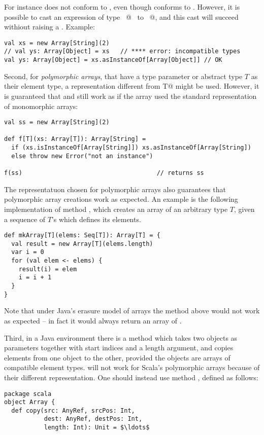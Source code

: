 {For instance  does not conform to
, even though  conforms to .
However, it is possible to cast an expression of type
~\lstinline@Array[String]@~ to ~\lstinline@Array[Object]@, and this
cast will succeed withiout raising a . Example:
\begin{lstlisting}
val xs = new Array[String](2)
// val ys: Array[Object] = xs   // **** error: incompatible types
val ys: Array[Object] = xs.asInstanceOf[Array[Object]] // OK
\end{lstlisting}

Second, for {\em polymorphic arrays}, that have a type parameter or
abstract type $T$ as their element type, a representation different
from
\lstinline@[]T@ might be used. However, it is guaranteed that 
 and  still work as if the array 
used the standard representation of monomorphic arrays:
\begin{lstlisting}
val ss = new Array[String](2)

def f[T](xs: Array[T]): Array[String] = 
  if (xs.isInstanceOf[Array[String]]) xs.asInstanceOf[Array[String])
  else throw new Error("not an instance")

f(ss)                                     // returns ss
\end{lstlisting}
The representatuon chosen for polymorphic arrays also guarantees that
polymorphic array creations work as expected. An example is the
following implementation of method \lstinline@mkArray@, which creates
an array of an arbitrary type $T$, given a sequence of $T$'s which
defines its elements.
\begin{lstlisting}
def mkArray[T](elems: Seq[T]): Array[T] = {
  val result = new Array[T](elems.length)
  var i = 0
  for (val elem <- elems) {
    result(i) = elem
    i = i + 1
  }
}
\end{lstlisting}
Note that under Java's erasure model of arrays the method above would
not work as expected -- in fact it would always return an array of
\lstinline@Object@.

Third, in a Java environment there is a method 
which takes two objects as parameters together with start indices and
a length argument, and copies elements from one object to the other,
provided the objects are arrays of compatible element
types.  will not work for Scala's polymorphic
arrays because of their different representation. One should instead
use method , defined as follows:
\begin{lstlisting}
package scala
object Array { 
  def copy(src: AnyRef, srcPos: Int, 
           dest: AnyRef, destPos: Int, 
           length: Int): Unit = $\ldots$
\end{lstlisting}

}

